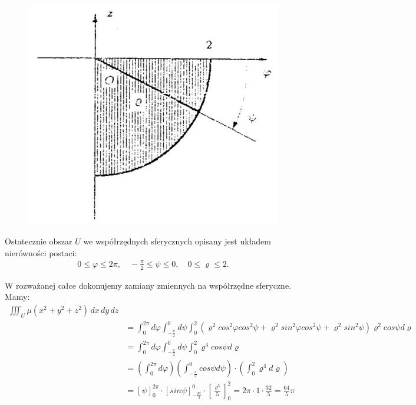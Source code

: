 \documentclass[12pt]{article}
\begin{document}
    \begin{figure}[H]
        \includegraphics[width=\linewidth/2]{28_2b.jpg}
    \end{figure}

    Ostatecznie obszar $U$ we współrzędnych sferycznych opisany jest układem nierówności postaci:
    \begin{align*}
        0 \leq \varphi \leq 2\pi, \quad -\frac{\pi}{2}\leq \psi \leq 0, \quad 0 \leq \varrho \leq 2.
    \end{align*}

    W rozważanej całce dokonujemy zamiany zmiennych na współrzędne sferyczne. Mamy:
    \begin{align*}
        \iiint_U \mu(x^2+y^2+z^2) \,dx\,dy\,dz
        \\ &= \int_{0}^{2\pi} d\varphi \int_{-\frac{\pi}{2}}^{0} d\psi \int_{0}^{2} (\varrho^2 cos^2\varphi cos^2\psi+\varrho^2sin^2\varphi cos^2\psi + \varrho^2sin^2\psi) \varrho^2cos\psi d\varrho
        \\ &= \int_{0}^{2\pi} d\varphi \int_{-\frac{\pi}{2}}^{0} d\psi \int_{0}^{2} \varrho^4cos\psi d\varrho
        \\ &= \left(\int_{0}^{2\pi} d\varphi\right) \left(\int_{-\frac{\pi}{2}}^{0} cos\psi d\psi\right)\cdot \left(\int_{0}^{2} \varrho^4 d\varrho \right)
        \\ &= \left[\psi\right]_0^{2\pi} \cdot \left[sin\psi\right]_{-\frac{pi}{2}}^0 \cdot \left[\frac{\varrho ^5}{5}\right]_0^2 = 2\pi \cdot 1 \cdot \frac{32}{5}=\frac{64}{5}\pi
    \end{align*}
\end{document}
